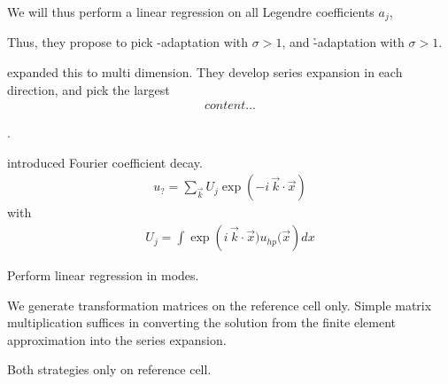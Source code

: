 We will thus perform a linear regression on all Legendre coefficients $a_j$, 

Thus, they propose to pick \p-adaptation with $\sigma > 1$, and \h-adaptation with $\sigma > 1$.

\cite[Ch.~4]{eibner2007}

\textcite[Sec.~2.4]{houston2005}

 expanded this to multi dimension. They develop series expansion in each direction, and pick the largest 
\begin{align*}
  content...
\end{align*}

\cite{davydov2017}.


\textcite{bangerth2009} introduced Fourier coefficient decay. \textcite{dealiistep-27}
\begin{align}
u_? = \sum\limits_{\vec{k}} U_j \exp\left(-i \, \vec{k} \cdot \vec{x}\right)
\end{align}
with
\begin{align}
U_j = \int \exp\left(i \, \vec{k} \cdot \vec{x}) u_{hp}(\vec{x}\right) dx
\end{align}


Perform linear regression in modes.


We generate transformation matrices on the reference cell only. Simple matrix multiplication suffices in converting the solution from the finite element approximation into the series expansion.

Both strategies only on reference cell.